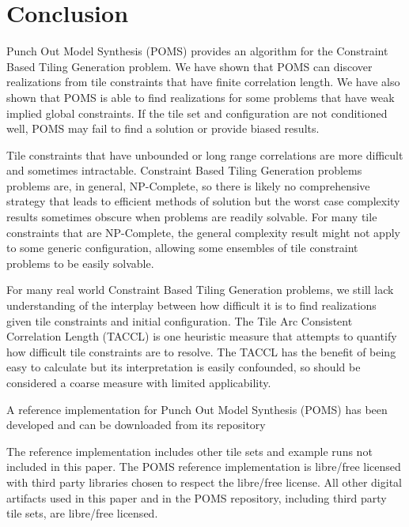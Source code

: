 \section{Conclusion}

Punch Out Model Synthesis (POMS) provides an algorithm for the Constraint Based Tiling Generation problem.
We have shown that POMS can discover realizations from tile constraints that have finite correlation length.
We have also shown that POMS is able to find realizations for some problems
that have weak implied global constraints.
If the tile set and configuration are not conditioned well,
POMS may fail to find a solution or provide biased results.

Tile constraints that have unbounded or long range correlations are more difficult and sometimes intractable.
Constraint Based Tiling Generation problems problems are, in general, NP-Complete, so there is likely
no comprehensive strategy that leads to efficient methods of solution but the worst case complexity
results sometimes obscure when problems are readily solvable.
For many tile constraints that are NP-Complete, the general complexity result might not
apply to some generic configuration, allowing some ensembles of tile constraint problems
to be easily solvable.

For many real world Constraint Based Tiling Generation problems, we still lack understanding of the
interplay between how difficult it is to find realizations given tile constraints
and initial configuration.
The Tile Arc Consistent Correlation Length (TACCL) is one heuristic measure that attempts
to quantify how difficult tile constraints are to resolve.
The TACCL has the benefit of being easy to calculate but its interpretation is easily confounded,
so should be considered a coarse measure with limited applicability.

A reference implementation for Punch Out Model Synthesis (POMS) has been developed and can be downloaded
from its repository

The reference implementation includes other tile sets and example runs not included in this paper.
The POMS reference implementation is libre/free licensed with third party libraries chosen to respect the libre/free license.
All other digital artifacts used in this paper and in the POMS repository, including third party tile sets, are libre/free licensed.

